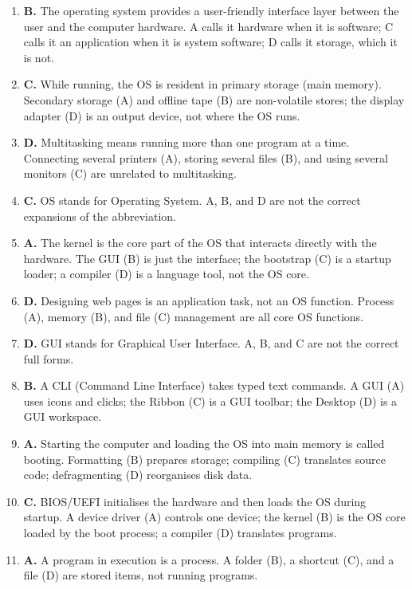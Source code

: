 \begin{enumerate}[label=\textbf{Q\arabic*.}, leftmargin=*]
\item \textbf{B.} The operating system provides a user-friendly interface
  layer between the user and the computer hardware. A calls it hardware when it
  is software; C calls it an application when it is system software; D calls it
  storage, which it is not.
\item \textbf{C.} While running, the OS is resident in primary storage (main
  memory). Secondary storage (A) and offline tape (B) are non-volatile stores;
  the display adapter (D) is an output device, not where the OS runs.
\item \textbf{D.} Multitasking means running more than one program at a time.
  Connecting several printers (A), storing several files (B), and using several
  monitors (C) are unrelated to multitasking.
\item \textbf{C.} OS stands for Operating System. A, B, and D are not the
  correct expansions of the abbreviation.
\item \textbf{A.} The kernel is the core part of the OS that interacts directly
  with the hardware. The GUI (B) is just the interface; the bootstrap (C) is a
  startup loader; a compiler (D) is a language tool, not the OS core.
\item \textbf{D.} Designing web pages is an application task, not an OS
  function. Process (A), memory (B), and file (C) management are all core OS
  functions.
\item \textbf{D.} GUI stands for Graphical User Interface. A, B, and C are not
  the correct full forms.
\item \textbf{B.} A CLI (Command Line Interface) takes typed text commands. A
  GUI (A) uses icons and clicks; the Ribbon (C) is a GUI toolbar; the Desktop
  (D) is a GUI workspace.
\item \textbf{A.} Starting the computer and loading the OS into main memory is
  called booting. Formatting (B) prepares storage; compiling (C) translates
  source code; defragmenting (D) reorganises disk data.
\item \textbf{C.} BIOS/UEFI initialises the hardware and then loads the OS
  during startup. A device driver (A) controls one device; the kernel (B) is
  the OS core loaded by the boot process; a compiler (D) translates programs.
\item \textbf{A.} A program in execution is a process. A folder (B), a shortcut
  (C), and a file (D) are stored items, not running programs.

\end{enumerate}
